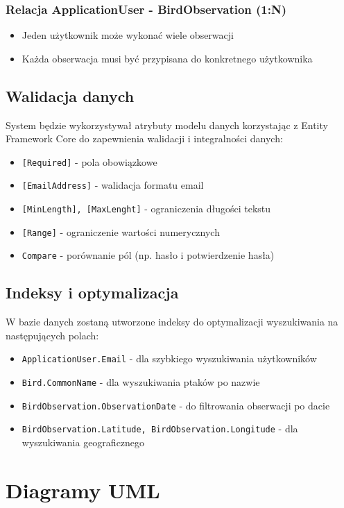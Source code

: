 \subsubsection{Relacja ApplicationUser - BirdObservation (1:N)}
\begin{itemize}
	\item Jeden użytkownik może wykonać wiele obserwacji
	\item Każda obserwacja musi być przypisana do konkretnego użytkownika
\end{itemize}

\subsection{Walidacja danych}
System będzie wykorzystywał atrybuty modelu danych korzystając z Entity Framework Core do zapewnienia walidacji i integralności danych:
\begin{itemize}
	\item \texttt{[Required]} - pola obowiązkowe
	\item \texttt{[EmailAddress]} - walidacja formatu email
	\item \texttt{[MinLength], [MaxLenght]} - ograniczenia długości tekstu
	\item \texttt{[Range]} - ograniczenie wartości numerycznych
	\item \texttt{Compare} - porównanie pól (np. hasło i potwierdzenie hasła)
\end{itemize}

\subsection{Indeksy i optymalizacja}
W bazie danych zostaną utworzone indeksy do optymalizacji wyszukiwania na następujących polach:
\begin{itemize}
	\item \texttt{ApplicationUser.Email} - dla szybkiego wyszukiwania użytkowników
	\item \texttt{Bird.CommonName} - dla wyszukiwania ptaków po nazwie
	\item \texttt{BirdObservation.ObservationDate} - do filtrowania obserwacji po dacie
	\item \texttt{BirdObservation.Latitude, BirdObservation.Longitude} - dla wyszukiwania geograficznego
\end{itemize}

\section{Diagramy UML}

